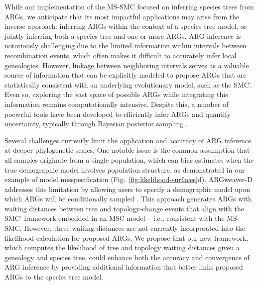 \documentclass[11pt]{article}
\begin{document}
While our implementation of the MS-SMC focused on inferring
species trees from ARGs, we anticipate that its most impactful
applications may arise from the inverse approach: inferring ARGs
within the context of a species tree model, or jointly inferring
both a species tree and one or more ARGs.
% 
ARG inference is notoriously challenging due to the limited 
information within intervals between recombination events, 
which often makes it difficult to accurately infer local
genealogies. However, linkage between neighboring intervals
serves as a valuable source of information that can be explicitly
modeled to propose ARGs that are statistically consistent with
an underlying evolutionary model, such as the SMC'.
% 
Even so, exploring the vast space of possible ARGs while 
integrating this information remains computationally intensive.
Despite this, a number of poewrful tools have been developed
to efficiently infer ARGs and quantify uncertainty, typically
through Bayesian posterior sampling
\citep{y_c_brandt_evaluation_2022}.

Several challenges currently limit the application and accuracy
of ARG inference at deeper phylogenetic scales. One notable issue
is the common assumption that all samples originate from a single
population, which can bias estimates when the true demographic 
model involves population structure, as demonstrated in our 
example of model misspecification
(Fig.~\ref{fig:likelihood-surfaces}d). 
ARGweaver-D addresses this limitation by allowing users to
specify a demographic model 
upon which ARGs will be conditionally sampled 
\citep{hubisz2020inference}.
This approach generates ARGs with waiting distances between 
tree and topology-change events that align with the SMC'
framework embedded in an MSC model -- i.e., consistent with
the MS-SMC. However, these waiting distances are not currently
incorporated into the likelihood calculation for proposed ARGs.
We propose that our new framework, which computes the likelihood
of tree and topology waiting distances given a genealogy and
species tree, could enhance both the accuracy and convergence
of ARG inference by providing additional information that 
better links proposed ARGs to the species tree model.

\end{document}
